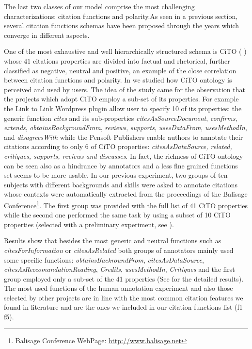 \documentclass[runningheads,a4paper]{llncs}
\begin{document}
The last two classes of our model comprise the most challenging characterizations: citation functions and polarity.As seen in a previous section, several citation functions schemas have been proposed through the years which converge in different aspects.

One of the most exhaustive and well hierarchically structured schema is CiTO ( \cite{__RefNumPara__4485_348126194}) whose 41 citations properties are divided into factual and rhetorical, further classified as negative, neutral and positive, an example of the close correlation between citation functions and polarity. In  \cite{__RefNumPara__4705_348126194} we studied how CiTO ontology is perceived and used by users. The idea of the study came for the observation that the projects which adopt CiTO employ a sub-set of its properties. For example the Link to Link Wordpress plugin allow user to specify 10 of its properties: the generic function {\em cites} and its sub-properties {\em citesAsSourceDocument}, {\em confirms}, {\em extends}, {\em obtainsBackgroundFrom}, {\em reviews}, {\em supports}, {\em usesDataFrom}, {\em usesMethodIn}, and {\em disagreesWith} while the Pensoft Publishers enable authors to annotate their citations according to only 6 of CiTO properties: {\em citesAsDataSource, related, critiques, supports, reviews and discusses}. In fact, the richness of CiTO ontology can be seen also as a hindrance by annotators and a less fine grained functions set seems to be more usable. In our previous experiment, two groups of ten subjects with different backgrounds and skills were asked to annotate citations whose contexts were automatically extracted from the proceedings of the Balisage Conference\footnote{Balisage Conference WebPage: \url{http://www.balisage.net}}. The first group was provided with the full list of 41 CiTO properties while the second one performed the same task by using a subset of 10 CiTO properties (selected with a preliminary experiment, see  \cite{__RefNumPara__4707_348126194}).

Results show that besides the most generic and neutral functions such as {\em citesForInformation} or {\em citesAsRelated} both groups of annotators mainly used some specific functions: {\em obtainsBackroundFrom}, {\em citesAsDataSource}, {\em citesAsReccomandationReading}, {\em Credits}, {\em usesMethodIn}, {\em Critiques} and the first group employed only a sub-set of the 41 properties (See  \cite{__RefNumPara__4705_348126194} for the detailed results). The most used functions of the human annotation experiment and also those selected by other projects are in line with the most common citation features we found in literature and are the ones we included in our citation functions list (f1-f5).
\end{document}
